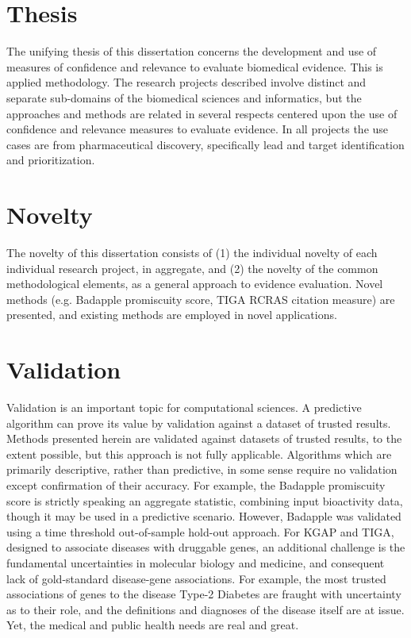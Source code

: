 \section{Thesis}

The unifying thesis of this dissertation concerns the development and use of measures of confidence and relevance to evaluate biomedical evidence. This is applied methodology. The research projects described involve distinct and separate sub-domains of the biomedical sciences and informatics, but the approaches and methods are related in several respects centered upon the use of confidence and relevance measures to evaluate evidence. In all projects the use cases are from pharmaceutical discovery, specifically lead and target identification and prioritization.  

\section{Novelty}

The novelty of this dissertation consists of (1) the individual novelty of each individual research project, in aggregate, and (2) the novelty of the common methodological elements, as a general approach to evidence evaluation. Novel methods (e.g. Badapple promiscuity score, TIGA RCRAS citation measure) are presented, and existing methods are employed in novel applications.

\section{Validation}

Validation is an important topic for computational sciences. A predictive algorithm can prove its value by validation against a dataset of trusted results. Methods presented herein are validated against datasets of trusted results, to the extent possible, but this approach is not fully applicable. Algorithms which are primarily descriptive, rather than predictive, in some sense require no validation except confirmation of their accuracy. For example, the Badapple promiscuity score is strictly speaking an aggregate statistic, combining input bioactivity data, though it may be used in a predictive scenario. However, Badapple was validated using a time threshold out-of-sample hold-out approach. For KGAP and TIGA, designed to associate diseases with druggable genes, an additional challenge is the fundamental uncertainties in molecular biology and medicine, and consequent lack of gold-standard disease-gene associations. For example, the most trusted associations of genes to the disease Type-2 Diabetes are fraught with uncertainty as to their role, and the definitions and diagnoses of the disease itself are at issue. Yet, the medical and public health needs are real and great. 

